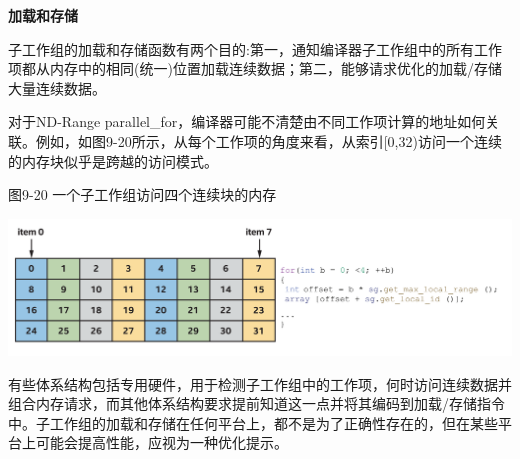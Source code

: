 \hspace*{\fill} \par %
\textbf{加载和存储}

子工作组的加载和存储函数有两个目的:第一，通知编译器子工作组中的所有工作项都从内存中的相同(统一)位置加载连续数据；第二，能够请求优化的加载/存储大量连续数据。\par

对于ND-Range parallel\_for，编译器可能不清楚由不同工作项计算的地址如何关联。例如，如图9-20所示，从每个工作项的角度来看，从索引[0,32)访问一个连续的内存块似乎是跨越的访问模式。\par

\hspace*{\fill} \par %
图9-20 一个子工作组访问四个连续块的内存
\begin{center}
	\includegraphics[width=1.\textwidth]{content/chapter-9/images/13}
\end{center}

有些体系结构包括专用硬件，用于检测子工作组中的工作项，何时访问连续数据并组合内存请求，而其他体系结构要求提前知道这一点并将其编码到加载/存储指令中。子工作组的加载和存储在任何平台上，都不是为了正确性存在的，但在某些平台上可能会提高性能，应视为一种优化提示。\par

































